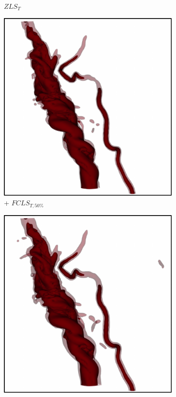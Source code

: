 \begin{figure}[!h]
\begin{subfigure}{0.20\linewidth}
\vspace{-1mm}
\caption{$ZLS_{T}$}
\vspace{-2mm}
\label{fig:tornado_zls}
\end{subfigure}
\begin{subfigure}{0.20\linewidth}
\centering
\includegraphics[width=0.9\linewidth]{Images/Tornado/fcls_50.pdf}
\vspace{-1mm}
\caption{+ $FCLS_{T,50\%}$}
\vspace{-2mm}
\label{fig:tornado_fls}
\end{subfigure}
\begin{subfigure}{0.20\linewidth}
\centering
\includegraphics[width=0.9\linewidth]{Images/Tornado/fcls_68.pdf}

\end{subfigure}
\end{figure}
